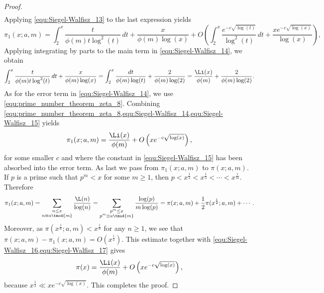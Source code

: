\begin{proof}
\begin{align*}
        \end{align*}
        Applying \cref{equ:Siegel-Walfisz_13} to the last expression yields
        \begin{equation}\label{equ:Siegel-Walfisz_14}
          \pi_{1}(x;a,m) = \int_{2}^{x}\frac{t}{\phi(m)t\log^{2}(t)}\,dt+\frac{x}{\phi(m)\log(x)}+O\left(\int_{2}^{x}\frac{e^{-c\sqrt{\log(t)}}}{\log^{2}(t)}\,dt+\frac{xe^{-c\sqrt{\log(x)}}}{\log(x)}\right),
        \end{equation}
        Applying integrating by parts to the main term in \cref{equ:Siegel-Walfisz_14}, we obtain
        \begin{equation}\label{equ:Siegel-Walfisz_15}
          \int_{2}^{x}\frac{t}{\phi(m)t\log^{2}(t)}\,dt+\frac{x}{\phi(m)\log(x)} = \int_{2}^{x}\frac{dt}{\phi(m)\log(t)}+\frac{2}{\phi(m)\log(2)} = \frac{\Li(x)}{\phi(m)}+\frac{2}{\phi(m)\log(2)}.
        \end{equation}
        As for the error term in \cref{equ:Siegel-Walfisz_14}, we use \cref{equ:prime_number_theorem_zeta_8}. Combining \cref{equ:prime_number_theorem_zeta_8,equ:Siegel-Walfisz_14,equ:Siegel-Walfisz_15} yields
        \begin{equation}\label{equ:Siegel-Walfisz_16}
          \pi_{1}(x;a,m) = \frac{\Li(x)}{\phi(m)}+O\left(xe^{-c\sqrt{\log(x)}}\right),
        \end{equation}
        for some smaller $c$ and where the constant in \cref{equ:Siegel-Walfisz_15} has been absorbed into the error term. As last we pass from $\pi_{1}(x;a,m)$ to $\pi(x;a,m)$. If $p$ is a prime such that $p^{m} < x$ for some $m \ge 1$, then $p < x^{\frac{1}{2}} < x^{\frac{1}{3}} < \cdots < x^{\frac{1}{m}}$. Therefore
        \begin{equation}\label{equ:Siegel-Walfisz_17}
          \pi_{1}(x;a,m) = \sum_{\substack{n \le x \\ n \equiv a \tmod{m}}}\frac{\L(n)}{\log(n)} = \sum_{\substack{p^{m} \le x \\ p^{m} \equiv a \tmod{m}}}\frac{\log(p)}{m\log(p)} = \pi(x;a,m)+\frac{1}{2}\pi(x^{\frac{1}{2}};a,m)+\cdots.
        \end{equation}
        Moreover, as $\pi(x^{\frac{1}{n}};a,m) < x^{\frac{1}{n}}$ for any $n \ge 1$, we see that $\pi(x;a,m)-\pi_{1}(x;a,m) = O(x^{\frac{1}{2}})$. This estimate together with \cref{equ:Siegel-Walfisz_16,equ:Siegel-Walfisz_17} gives
        \[
          \pi(x) = \frac{\Li(x)}{\phi(m)}+O\left(xe^{-c\sqrt{\log(x)}}\right),
        \]
        because $x^{\frac{1}{2}} \ll xe^{-c\sqrt{\log(x)}}$. This completes the proof.
      \end{proof}

